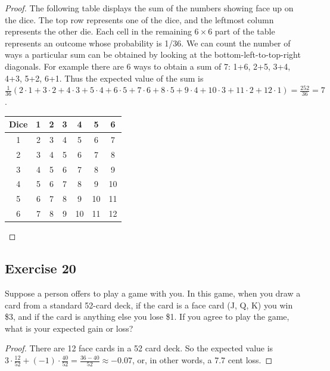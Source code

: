 \documentclass[14pt]{extarticle}
\begin{document}
\begin{proof}
     The following table displays the sum of the numbers showing face up on the dice. The top row represents one of the dice,
     and the leftmost column represents the other die. Each cell in the remaining \(6 \times 6\) part of the table represents an
     outcome whose probability is 1/36. We can count the number of ways a particular sum can be obtained by looking at the
     bottom-left-to-top-right diagonals. For example there are 6 ways to obtain a sum of 7: 1+6, 2+5, 3+4, 4+3, 5+2, 6+1. Thus
     the expected value of the sum is \(\frac{1}{36}(2 \cdot 1 + 3 \cdot 2 + 4 \cdot 3 + 5 \cdot 4 + 6 \cdot 5 + 7 \cdot 6 + 8 \cdot 5 + 9 \cdot 4 + 10 \cdot 3 + 11 \cdot 2 + 12 \cdot 1) = \frac{252}{36} = 7\).
     \begin{center}
          \begin{tabular}{c|c|c|c|c|c|c|}
               Dice & 1 & 2 & 3 & 4  & 5  & 6  \\
               \hline
               1    & 2 & 3 & 4 & 5  & 6  & 7  \\
               \hline
               2    & 3 & 4 & 5 & 6  & 7  & 8  \\
               \hline
               3    & 4 & 5 & 6 & 7  & 8  & 9  \\
               \hline
               4    & 5 & 6 & 7 & 8  & 9  & 10 \\
               \hline
               5    & 6 & 7 & 8 & 9  & 10 & 11 \\
               \hline
               6    & 7 & 8 & 9 & 10 & 11 & 12 \\
               \hline
          \end{tabular}
     \end{center}
\end{proof}

\subsection{Exercise 20}
Suppose a person offers to play a game with you. In this game, when you draw a card from a standard 52-card deck, if the card
is a face card (J, Q, K) you win \$3, and if the card is anything else you lose \$1. If you agree to play the game,
what is your expected gain or loss?

\begin{proof}
     There are 12 face cards in a 52 card deck. So the expected value is \(3 \cdot \frac{12}{52} + (-1) \cdot \frac{40}{52}
     = \frac{36-40}{52} \approx -0.07\), or, in other words, a 7.7 cent loss.
\end{proof}
\end{document}
